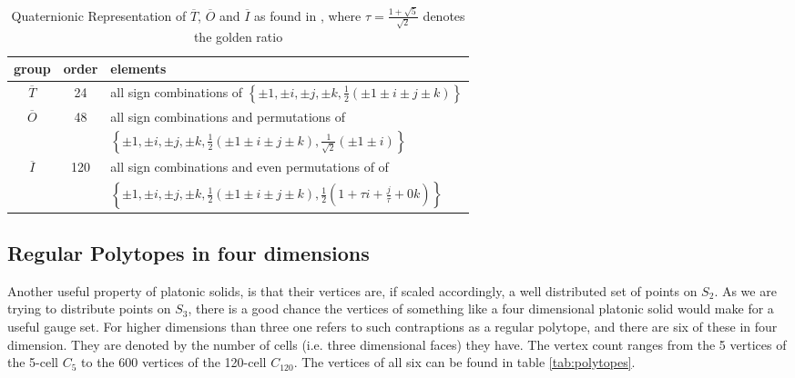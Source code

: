 \begin{table}
 \centering
 \begin{tabu}{c|c|l}
  group          & order & elements                                                                                                                                                   \\
  \hline
  $\overline{T}$ & 24    & all sign combinations of $\left\{\pm 1, \pm i, \pm j, \pm k, \frac{1}{2}\left( \pm 1 \pm i \pm j \pm k \right) \right\} $                                  \\
  \hline
  $\overline{O}$ & 48    & all sign combinations and permutations of                                                                                                                  \\
                 &       & $\left\{\pm 1, \pm i, \pm j, \pm k, \frac{1}{2}\left( \pm 1 \pm i \pm j \pm k \right) , \frac{1}{\sqrt{2}}\left( \pm 1 \pm i \right) \right\} $            \\
  \hline
  $\overline{I}$ & 120   & all sign combinations and even permutations of of                                                                                                          \\
                 &       & $\left\{\pm 1, \pm i, \pm j, \pm k, \frac{1}{2}\left( \pm 1 \pm i \pm j \pm k \right) , \frac{1}{2}\left(1+\tau i + \frac{j}{\tau} + 0k \right) \right\} $ \\
 \end{tabu}
 \caption{Quaternionic Representation of $\overline{T}$, $\overline{O}$ and $\overline{I}$ as found in \cite{duval:1964}, where $\tau= \frac{1+\sqrt{5}}{\sqrt{2}}$ denotes the golden ratio}
 \label{tab:subgroups}
\end{table}

\subsection{Regular Polytopes in four dimensions}

Another useful property of platonic solids, is that their vertices are, if scaled accordingly, a well distributed set of points on $S_2$. As we are trying to distribute points on $S_3$, there is a good chance the vertices of something like a four dimensional platonic solid would make for a useful gauge set. For higher dimensions than three one refers to such contraptions as a regular polytope, and there are six of these in four dimension. They are denoted by the number of cells (i.e. three dimensional faces) they have. The vertex count ranges from the 5 vertices of the 5-cell $C_5$ to the 600 vertices of the 120-cell $C_{120}$. The vertices of all six can be found in table \ref{tab:polytopes}.


